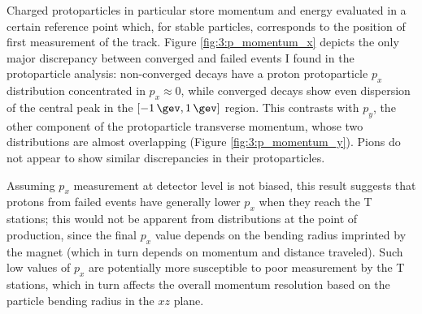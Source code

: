 Charged protoparticles in particular store momentum and energy evaluated in a certain reference point which, for stable particles, corresponds to the position of first measurement of the track.
Figure \ref{fig:3:p_momentum_x} depicts the only major discrepancy between converged and failed events I found in the protoparticle analysis:
non-converged \lbz decays have a proton protoparticle $p_x$ distribution concentrated in $p_x \approx 0$, while converged decays show even dispersion of the central peak in the $[-\SI{1}{\gev},\SI{1}{\gev}]$ region.
This contrasts with $p_y$, the other component of the protoparticle transverse momentum, whose two distributions are almost overlapping (Figure \ref{fig:3:p_momentum_y}).
Pions do not appear to show similar discrepancies in their protoparticles.

Assuming $p_x$ measurement at detector level is not biased, this result suggests that protons from failed events have generally lower $p_x$ when they reach the T stations;
this would not be apparent from \pt distributions at the point of production, since the final $p_x$ value depends on the bending radius imprinted by the magnet (which in turn depends on momentum and distance traveled).
Such low values of $p_x$ are potentially more susceptible to poor measurement by the T stations, which in turn affects the overall momentum resolution based on the particle bending radius in the $xz$ plane.

%
%
%
%
%
%
%

